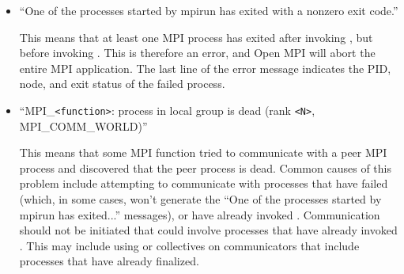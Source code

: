 \begin{itemize}
\item ``One of the processes started by mpirun has exited with a
  nonzero exit code.''
  
  This means that at least one MPI process has exited after invoking
  , but before invoking
  .  This is therefore an error, and Open MPI
  will abort the entire MPI application.  The last line of the error
  message indicates the PID, node, and exit status of the failed
  process.
  
\item ``MPI\_{\tt <function>}: process in local group is dead (rank
  {\tt <N>}, MPI\_\-COMM\_\-WORLD)''
  
  This means that some MPI function tried to communicate with a peer
  MPI process and discovered that the peer process is dead.  Common
  causes of this problem include attempting to communicate with
  processes that have failed (which, in some cases, won't generate the
  ``One of the processes started by mpirun has exited...'' messages),
  or have already invoked .  Communication
  should not be initiated that could involve processes that have
  already invoked .  This may include using
   or collectives on communicators that
  include processes that have already finalized.
\end{itemize}
